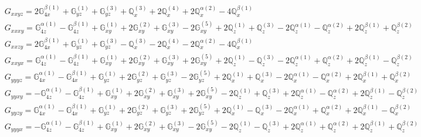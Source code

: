 \documentclass[fleqn,8pt,landscape]{jsarticle}
\begin{document}
\begin{align*}
& G_{xxyz} = 2 \mathbb{G}_{4x}^{\beta(1)} + \mathbb{G}_{yz}^{(1)} + \mathbb{G}_{yz}^{(3)} + \mathbb{Q}_{x}^{(3)} + 2 \mathbb{Q}_{x}^{(4)} + 2 \mathbb{Q}_{x}^{\alpha(2)} - 4 \mathbb{Q}_{x}^{\beta(1)} \\
& G_{xxxy} = \mathbb{G}_{4z}^{\alpha(1)} - \mathbb{G}_{4z}^{\beta(1)} + \mathbb{G}_{xy}^{(1)} + 2 \mathbb{G}_{xy}^{(2)} + \mathbb{G}_{xy}^{(3)} - 2 \mathbb{G}_{xy}^{(5)} + 2 \mathbb{Q}_{z}^{(1)} + \mathbb{Q}_{z}^{(3)} - 2 \mathbb{Q}_{z}^{\alpha(1)} - \mathbb{Q}_{z}^{\alpha(2)} + 2 \mathbb{Q}_{z}^{\beta(1)} + \mathbb{Q}_{z}^{\beta(2)} \\
& G_{xxzy} = 2 \mathbb{G}_{4x}^{\beta(1)} + \mathbb{G}_{yz}^{(1)} + \mathbb{G}_{yz}^{(3)} - \mathbb{Q}_{x}^{(3)} - 2 \mathbb{Q}_{x}^{(4)} - 2 \mathbb{Q}_{x}^{\alpha(2)} - 4 \mathbb{Q}_{x}^{\beta(1)} \\
& G_{xxyx} = \mathbb{G}_{4z}^{\alpha(1)} - \mathbb{G}_{4z}^{\beta(1)} + \mathbb{G}_{xy}^{(1)} + 2 \mathbb{G}_{xy}^{(2)} + \mathbb{G}_{xy}^{(3)} + 2 \mathbb{G}_{xy}^{(5)} + 2 \mathbb{Q}_{z}^{(1)} - \mathbb{Q}_{z}^{(3)} - 2 \mathbb{Q}_{z}^{\alpha(1)} + \mathbb{Q}_{z}^{\alpha(2)} + 2 \mathbb{Q}_{z}^{\beta(1)} - \mathbb{Q}_{z}^{\beta(2)} \\
& G_{yyyz} = \mathbb{G}_{4x}^{\alpha(1)} - \mathbb{G}_{4x}^{\beta(1)} + \mathbb{G}_{yz}^{(1)} + 2 \mathbb{G}_{yz}^{(2)} + \mathbb{G}_{yz}^{(3)} - 2 \mathbb{G}_{yz}^{(5)} + 2 \mathbb{Q}_{x}^{(1)} + \mathbb{Q}_{x}^{(3)} - 2 \mathbb{Q}_{x}^{\alpha(1)} - \mathbb{Q}_{x}^{\alpha(2)} + 2 \mathbb{Q}_{x}^{\beta(1)} + \mathbb{Q}_{x}^{\beta(2)} \\
& G_{yyxy} = - \mathbb{G}_{4z}^{\alpha(1)} - \mathbb{G}_{4z}^{\beta(1)} + \mathbb{G}_{xy}^{(1)} + 2 \mathbb{G}_{xy}^{(2)} + \mathbb{G}_{xy}^{(3)} + 2 \mathbb{G}_{xy}^{(5)} - 2 \mathbb{Q}_{z}^{(1)} + \mathbb{Q}_{z}^{(3)} + 2 \mathbb{Q}_{z}^{\alpha(1)} - \mathbb{Q}_{z}^{\alpha(2)} + 2 \mathbb{Q}_{z}^{\beta(1)} - \mathbb{Q}_{z}^{\beta(2)} \\
& G_{yyzy} = \mathbb{G}_{4x}^{\alpha(1)} - \mathbb{G}_{4x}^{\beta(1)} + \mathbb{G}_{yz}^{(1)} + 2 \mathbb{G}_{yz}^{(2)} + \mathbb{G}_{yz}^{(3)} + 2 \mathbb{G}_{yz}^{(5)} + 2 \mathbb{Q}_{x}^{(1)} - \mathbb{Q}_{x}^{(3)} - 2 \mathbb{Q}_{x}^{\alpha(1)} + \mathbb{Q}_{x}^{\alpha(2)} + 2 \mathbb{Q}_{x}^{\beta(1)} - \mathbb{Q}_{x}^{\beta(2)} \\
& G_{yyyx} = - \mathbb{G}_{4z}^{\alpha(1)} - \mathbb{G}_{4z}^{\beta(1)} + \mathbb{G}_{xy}^{(1)} + 2 \mathbb{G}_{xy}^{(2)} + \mathbb{G}_{xy}^{(3)} - 2 \mathbb{G}_{xy}^{(5)} - 2 \mathbb{Q}_{z}^{(1)} - \mathbb{Q}_{z}^{(3)} + 2 \mathbb{Q}_{z}^{\alpha(1)} + \mathbb{Q}_{z}^{\alpha(2)} + 2 \mathbb{Q}_{z}^{\beta(1)} + \mathbb{Q}_{z}^{\beta(2)} \\

\end{align*}
\end{document}
